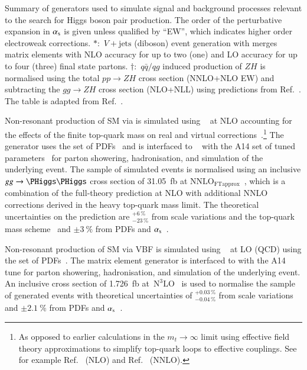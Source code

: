 \begin{sidewaystable}[p]
  \centering

  \caption{Summary of generators used to simulate signal and background
    processes relevant to the search for Higgs boson pair production. The order
    of the perturbative expansion in $\alpha_{\text{s}}$ is given unless qualified by
    ``EW'', which indicates higher order electroweak
    corrections. $*$:~$V+\text{jets}$ (diboson) event generation with
    \SHERPA[2.2.1] merges matrix elements with NLO accuracy for up to two (one)
    and LO accuracy for up to four (three) final state
    partons. $\dagger$:~$q\bar{q} / qg$ induced production of $ZH$ is normalised
    using the total $pp \to ZH$ cross section (NNLO+NLO EW) and subtracting the
    $gg \to ZH$ cross section (NLO+NLL) using predictions from
    Ref.~\cite{deFlorian:2016spz}. The table is adapted from
    Ref.~\cite{ATLAS-CONF-2021-030}.}%
  \label{tab:monte_carlo}

  \resizebox{\textwidth}{!}{}
\end{sidewaystable}

Non-resonant production of SM \HH via \ggF is simulated using
\POWHEGBOX[v2]~\cite{Nason:2004rx,Frixione:2007vw,Alioli:2010xd} at NLO
accounting for the effects of the finite top-quark mass on real and virtual
corrections~\cite{Borowka:2016ehy,Baglio:2018lrj,Heinrich:2017kxx,Heinrich:2019bkc,Heinrich:2020ckp}.\footnote{As
  opposed to earlier calculations in the $m_{t} \to \infty$ limit using
  effective field theory approximations to simplify top-quark loops to effective
  couplings. See for example Ref.~\cite{Dawson:1998py} (NLO) and
  Ref.~\cite{deFlorian:2013jea} (NNLO).} The generator uses the
\PDFforLHC[15nlo] set of PDFs~\cite{Butterworth:2015oua} and is interfaced to
\PYTHIA[8]~\cite{Sjostrand:2014zea} with the A14 set of tuned
parameters~\cite{ATL-PHYS-PUB-2014-021} for parton showering, hadronisation, and
simulation of the underlying event. The sample of simulated events is normalised
using an inclusive $gg \to \HH$ cross section of \SI{31.05}{\femto\barn} at
$\text{NNLO}_{\text{FTapprox}}$~\cite{Grazzini:2018bsd}, which is a combination
of the full-theory prediction at NLO with additional NNLO corrections derived in
the heavy top-quark mass limit. The theoretical uncertainties on the prediction
are $^{+6\,\%}_{-23\,\%}$ from scale variations and the top-quark mass
scheme~\cite{Baglio:2020wgt} and $\pm\SI{3}{\percent}$ from PDFs and
$\alpha_{\text{s}}$~\cite{LHCHWGHH}.

Non-resonant production of SM \HH via VBF is simulated using
\MGNLO~\cite{Alwall:2014hca} %
at LO (QCD) %
using the \NNPDF[3.0nlo] set of PDFs~\cite{Ball:2014uwa}. The matrix
element generator is interfaced to \PYTHIA[8] with the A14 tune for
parton showering, hadronisation, and simulation of the underlying
event. An inclusive cross section of \SI{1.726}{\femto\barn}
at~$\text{N}^3\text{LO}$~\cite{Dreyer:2018qbw,LHCHWGHH} is used to
normalise the sample of generated events with theoretical
uncertainties of $^{+0.03\,\%}_{-0.04\,\%}$ from scale variations and
$\pm\SI{2.1}{\percent}$ from PDFs and $\alpha_{\text{s}}$~\cite{LHCHWGHH}.

